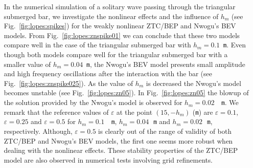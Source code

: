 In the numerical simulation of a solitary wave passing
through the triangular submerged bar, we investigate the
nonlinear effects and the influence of $h_m$ (see
Fig.~\ref{fig:lopes:spikes}) for the weakly nonlinear
ZTC/BEP and Nwogu's BEV models.  From
Fig.~\ref{fig:lopes:znspike01} we can conclude that these
two models compare well in the case of the triangular
submerged bar with $h_m=0.1$~{\tt m}.  Even though both
models compare well for the triangular submerged bar with a
smaller value of $h_m=0.04$~{\tt m}, the Nwogu's BEV model
presents small amplitude and high frequency oscillations
after the interaction with the bar (see
Fig.~\ref{fig:lopes:znspike025}).
  As the value of $h_m$
is decreased the Nwogu's model becomes unstable (see
Fig.~\ref{fig:lopes:zn05}).
In Fig.~\ref{fig:lopes:zn05} the blowup of the solution
provided by the Nwogu's model is observed for $h_m=0.02$~{\tt
m}.  We remark that the reference values of
$\varepsilon$ at the point $(15,-h_m)$ ({\tt m}) are $\varepsilon=0.1$,
$\varepsilon=0.25$ and $\varepsilon=0.5$ for $h_m=0.1$~{\tt
m}, $h_m=0.04$\,~{\tt m} and $h_m=0.02$\,~{\tt m},
respectively. Although, $\varepsilon=0.5$ is clearly out of
the range of validity of both ZTC/BEP  and Nwogu's BEV models, the
first one seems more robust when dealing with the nonlinear
effects. These stability properties of the ZTC/BEP  model
are also observed in numerical tests involving grid refinements.

